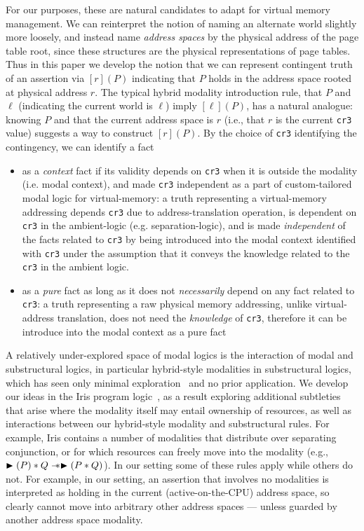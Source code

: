 For our purposes, these are natural candidates to adapt for virtual memory management. We can reinterpret the notion of 
naming an alternate world slightly more loosely, and instead name \emph{address spaces} by the physical address of the 
page table root, since these structures are the physical representations of page tables. Thus in this paper we develop 
the notion that we can represent contingent truth of an assertion via $[r](P)$ indicating that $P$ holds in the address 
space rooted at physical address $r$.
The typical hybrid modality introduction rule, that $P$ and $\ell$ (indicating the current world is $\ell$) imply 
$[\ell](P)$, has a natural analogue: knowing $P$ and that the current address space is $r$ (i.e., that $r$ is the 
current \texttt{cr3} value) suggests a way to construct $[r](P)$. By the choice of \texttt{cr3} identifying the contingency, we can identify a fact
\begin{itemize}
  \item as a \textit{context} fact if its validity depends on \texttt{cr3} when it is outside the modality (i.e. modal context), and made \texttt{cr3} independent as a part of custom-tailored modal logic for virtual-memory: a truth representing a virtual-memory addressing depends \texttt{cr3} due to address-translation operation, is dependent on \texttt{cr3} in the ambient-logic (e.g. separation-logic), and is made \textit{independent} of the facts related to \texttt{cr3} by being introduced into the modal context identified with \texttt{cr3} under the assumption that it conveys the knowledge related to the \texttt{cr3} in the ambient logic.
  \item as a \textit{pure} fact as long as it does not \textit{necessarily} depend on any fact related to \texttt{cr3}: a truth representing a raw physical memory addressing, unlike virtual-address translation, does not need the \textit{knowledge} of \texttt{cr3}, therefore it can be introduce into the modal context as a pure fact
\end{itemize}

A relatively under-explored space of modal logics is the interaction of modal and substructural logics, 
in particular hybrid-style modalities in substructural logics, which has seen only minimal exploration~ and no prior 
application. We develop our ideas in the Iris program logic~\cite{jung2018iris}, as a result exploring additional subtleties 
that arise where the modality itself may entail ownership of resources, as well as interactions between our hybrid-style 
modality and substructural rules.  For example, Iris contains a number of modalities that distribute over separating 
conjunction, or for which resources can freely move into the modality 
(e.g., $\blacktriangleright(P)\ast Q \mathrel{-\!\!\ast} \blacktriangleright(P\ast Q)$). In our setting some of these rules 
apply while others do not. For example, in our setting, an assertion that involves no modalities is interpreted as 
holding in the current (active-on-the-CPU) address space, so clearly cannot move into arbitrary other address spaces 
--- unless guarded by another address space modality.
